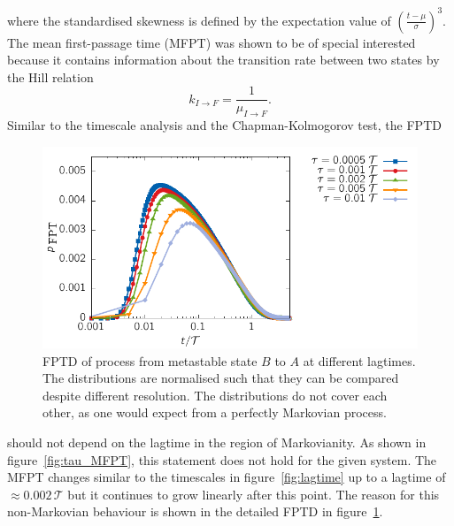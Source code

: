 where the standardised skewness is defined by the expectation value of $\left( \frac{t-\mu}{\sigma} \right )^3$.
The mean first-passage time (MFPT) was shown to be of special interested because it contains information about the transition rate between two states by the Hill relation~\cite{hill2005free}
\begin{equation}
 k_{I \to F} = \frac{1}{\mu_{I \to F}}.
\end{equation}
Similar to the timescale analysis and the Chapman-Kolmogorov test, the FPTD \begin{figure}[t]
\centering
 \includegraphics{../plots/MSM/tao_fpt.pdf}
\caption[First-passage time distribution of process from metastable state $B$ to $A$ at different lagtimes.]{FPTD of process from metastable state $B$ to $A$ at different lagtimes. The distributions are normalised such that they can be compared despite different resolution. The distributions do not cover each other, as one would expect from a perfectly Markovian process.}
\label{fig:tau_fpt}
\end{figure}
should not depend on the lagtime in the region of Markovianity. As shown in figure~\ref{fig:tau_MFPT}, this statement does not hold for the given system. The MFPT changes similar to the timescales in figure~\ref{fig:lagtime} up to a lagtime of $\approx 0.002\,\mathcal{T}$ but it continues to grow linearly after this point. The reason for this non-Markovian behaviour is shown in the detailed FPTD in figure~\ref{fig:tau_fpt}.
